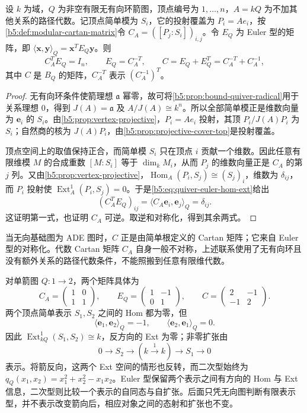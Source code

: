 \begin{proposition}\label{b5:prop:path-cartan-euler}
	设 \(k\) 为域，\(Q\) 为非空有限无有向环箭图，顶点编号为 \(1,\ldots,n\)，\(A=kQ\) 为不加其他关系的路径代数。记顶点简单模为 \(S_i\)，它的投射覆盖为 \(P_i=Ae_i\)，按\cref{b5:def:modular-cartan-matrix}令 \(C_A=([P_j:S_i])_{i,j}\)。令 \(E_Q\) 为 Euler 型的矩阵，即 \(\langle\mathbf x,\mathbf y\rangle_Q=\mathbf x^T E_Q\mathbf y\)。则
	\begin{equation}\label{b5:eq:path-cartan-euler}
		C_A^T E_Q=I_n,\qquad E_Q=C_A^{-T},\qquad C=E_Q+E_Q^T=C_A^{-T}+C_A^{-1},
	\end{equation}
	其中 \(C\) 是 \(B_Q\) 的矩阵，\(C_A^{-T}\) 表示 \((C_A^{-1})^T\)。
\end{proposition}
\begin{proof}
	无有向环条件使箭理想 \(\mathfrak a\) 幂零，故可将\cref{b5:prop:bound-quiver-radical}用于关系理想 \(0\)，得到 \(J(A)=\mathfrak a\) 及 \(A/J(A)\cong k^n\)。所以全部简单模正是维数向量为 \(\mathbf e_i\) 的 \(S_i\)。由\cref{b5:prop:vertex-projective}，\(P_i=Ae_i\) 投射，其顶 \(P_i/J(A)P_i\) 为 \(S_i\)；自然商的核为 \(J(A)P_i\)，由\cref{b5:prop:projective-cover-top}是投射覆盖。

	顶点空间上的取值保持正合，而简单模 \(S_i\) 只在顶点 \(i\) 贡献一个维数。因此任意有限维模 \(M\) 的合成重数 \([M:S_i]\) 等于 \(\dim_k M_i\)，从而 \(P_j\) 的维数向量正是 \(C_A\) 的第 \(j\) 列。又由\cref{b5:prop:vertex-projective}，\(\operatorname{Hom}_A(P_i,S_j)\cong(S_j)_i\)，维数为 \(\delta_{ij}\)，而 \(P_i\) 投射使 \(\operatorname{Ext}_A^1(P_i,S_j)=0\)。于是\eqref{b5:eq:quiver-euler-hom-ext}给出
	\[
		(C_A^TE_Q)_{ij} =\langle C_A\mathbf e_i,\mathbf e_j\rangle_Q=\delta_{ij}.
	\]
	这证明第一式，也证明 \(C_A\) 可逆。取逆和对称化，得到其余两式。
\end{proof}

当无向基础图为 ADE 图时，\(C\) 正是由简单根定义的 Cartan 矩阵；它来自 Euler 型的对称化。代数 Cartan 矩阵 \(C_A\) 自身一般不对称，上述联系使用了无有向环且没有额外关系的路径代数条件，不能照搬到任意有限维代数。

对单箭图 \(Q:1\to2\)，两个矩阵具体为
\[
	C_A=\begin{pmatrix}1&0\\1&1\end{pmatrix},\qquad
	E_Q=\begin{pmatrix}1&-1\\0&1\end{pmatrix},\qquad
	C=\begin{pmatrix}2&-1\\-1&2\end{pmatrix}.
\]
两个顶点简单表示 \(S_1,S_2\) 之间的 Hom 都为零，但
\[
	\langle\mathbf e_1,\mathbf e_2\rangle_Q=-1, \qquad \langle\mathbf e_2,\mathbf e_1\rangle_Q=0.
\]
因此 \(\operatorname{Ext}^1_{kQ}(S_1,S_2)\cong k\)，反方向的 Ext 为零；非零扩张由
\[
	0\longrightarrow S_2\longrightarrow (k\xrightarrow{1}k)\longrightarrow S_1\longrightarrow0
\]
表示。将箭反向，这两个 Ext 空间的情形也反转，而二次型始终为 \(q_Q(x_1,x_2)=x_1^2+x_2^2-x_1x_2\)。Euler 型保留两个表示之间有方向的 Hom 与 Ext 信息，二次型则比较一个表示的自同态与自扩张。后面只凭无向图判断有限表示型，并不表示改变箭向后，相应对象之间的态射和扩张也不变。

